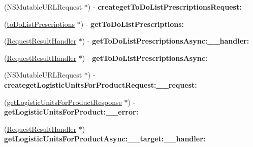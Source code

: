 \begin{DoxyCompactItemize}
\item 
\hypertarget{interface_supply_chain_service_port_binding_a70cd0f1e4cfcf97ffd3afb020c80ac3c}{}(N\+S\+Mutable\+U\+R\+L\+Request $\ast$) -\/ {\bfseries createget\+To\+Do\+List\+Prescriptions\+Request\+:}\label{interface_supply_chain_service_port_binding_a70cd0f1e4cfcf97ffd3afb020c80ac3c}

\item 
\hypertarget{interface_supply_chain_service_port_binding_a245c72f7536c95281995f2f2b8b8a427}{}(\hyperlink{interfaceto_do_list_prescriptions}{to\+Do\+List\+Prescriptions} $\ast$) -\/ {\bfseries get\+To\+Do\+List\+Prescriptions\+:}\label{interface_supply_chain_service_port_binding_a245c72f7536c95281995f2f2b8b8a427}

\item 
\hypertarget{interface_supply_chain_service_port_binding_ac33bcda6e5e0872fc0f89371b875d3bc}{}(\hyperlink{interface_request_result_handler}{Request\+Result\+Handler} $\ast$) -\/ {\bfseries get\+To\+Do\+List\+Prescriptions\+Async\+:\+\_\+\+\_\+handler\+:}\label{interface_supply_chain_service_port_binding_ac33bcda6e5e0872fc0f89371b875d3bc}

\item 
\hypertarget{interface_supply_chain_service_port_binding_af131c06886ded3423998d07ada798afc}{}(\hyperlink{interface_request_result_handler}{Request\+Result\+Handler} $\ast$) -\/ {\bfseries get\+To\+Do\+List\+Prescriptions\+Async\+:}\label{interface_supply_chain_service_port_binding_af131c06886ded3423998d07ada798afc}

\item 
\hypertarget{interface_supply_chain_service_port_binding_aaa9dc023b9cd98cdc2081b03c2181a75}{}(N\+S\+Mutable\+U\+R\+L\+Request $\ast$) -\/ {\bfseries createget\+Logistic\+Units\+For\+Product\+Request\+:\+\_\+\+\_\+request\+:}\label{interface_supply_chain_service_port_binding_aaa9dc023b9cd98cdc2081b03c2181a75}

\item 
\hypertarget{interface_supply_chain_service_port_binding_a626cf4405c5289794d59eb3b5aa57619}{}(\hyperlink{interfaceget_logistic_units_for_product_response}{get\+Logistic\+Units\+For\+Product\+Response} $\ast$) -\/ {\bfseries get\+Logistic\+Units\+For\+Product\+:\+\_\+\+\_\+error\+:}\label{interface_supply_chain_service_port_binding_a626cf4405c5289794d59eb3b5aa57619}

\item 
\hypertarget{interface_supply_chain_service_port_binding_af48b2b8d93f89bf688204cc329198acd}{}(\hyperlink{interface_request_result_handler}{Request\+Result\+Handler} $\ast$) -\/ {\bfseries get\+Logistic\+Units\+For\+Product\+Async\+:\+\_\+\+\_\+target\+:\+\_\+\+\_\+handler\+:}\label{interface_supply_chain_service_port_binding_af48b2b8d93f89bf688204cc329198acd}


\end{DoxyCompactItemize}
